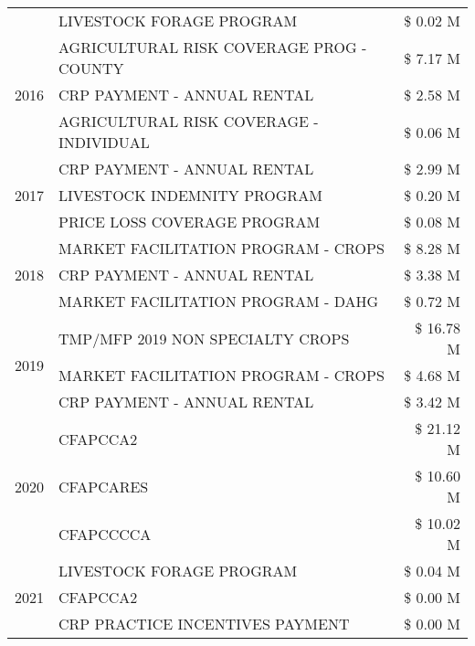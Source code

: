 \begin{tabular}{llr}
 & LIVESTOCK FORAGE PROGRAM & \$ 0.02 M \\
\cline{1-3}
\multirow[t]{3}{*}{2016} & AGRICULTURAL RISK COVERAGE PROG - COUNTY & \$ 7.17 M \\
 & CRP PAYMENT - ANNUAL RENTAL & \$ 2.58 M \\
 & AGRICULTURAL RISK COVERAGE - INDIVIDUAL & \$ 0.06 M \\
\cline{1-3}
\multirow[t]{3}{*}{2017} & CRP PAYMENT - ANNUAL RENTAL & \$ 2.99 M \\
 & LIVESTOCK INDEMNITY PROGRAM & \$ 0.20 M \\
 & PRICE LOSS COVERAGE PROGRAM & \$ 0.08 M \\
\cline{1-3}
\multirow[t]{3}{*}{2018} & MARKET FACILITATION PROGRAM - CROPS & \$ 8.28 M \\
 & CRP PAYMENT - ANNUAL RENTAL & \$ 3.38 M \\
 & MARKET FACILITATION PROGRAM - DAHG & \$ 0.72 M \\
\cline{1-3}
\multirow[t]{3}{*}{2019} & TMP/MFP 2019 NON SPECIALTY CROPS & \$ 16.78 M \\
 & MARKET FACILITATION PROGRAM - CROPS & \$ 4.68 M \\
 & CRP PAYMENT - ANNUAL RENTAL & \$ 3.42 M \\
\cline{1-3}
\multirow[t]{3}{*}{2020} & CFAPCCA2 & \$ 21.12 M \\
 & CFAPCARES & \$ 10.60 M \\
 & CFAPCCCCA & \$ 10.02 M \\
\cline{1-3}
\multirow[t]{3}{*}{2021} & LIVESTOCK FORAGE PROGRAM & \$ 0.04 M \\
 & CFAPCCA2 & \$ 0.00 M \\
 & CRP PRACTICE INCENTIVES PAYMENT & \$ 0.00 M \\
\cline{1-3}
\bottomrule
\end{tabular}
